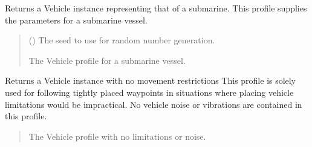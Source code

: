 \documentclass[letterpaper,10pt,english]{sphinxmanual}
\begin{document}
\begin{fulllineitems}
\label{\detokenize{modules/waypoints/vehicle:qnav.waypoints.vehicle.get_submarine_profile}}
\pysigstartsignatures
{}
\pysigstopsignatures
\sphinxAtStartPar
Returns a Vehicle instance representing that of a submarine.
This profile supplies the parameters for a submarine vessel.
\begin{quote}\begin{description}
\sphinxAtStartPar
{} () \textendash{} The seed to use for random number generation.

\sphinxAtStartPar
The Vehicle profile for a submarine vessel.

\sphinxAtStartPar
{\hyperref[\detokenize{modules/waypoints/vehicle:qnav.waypoints.vehicle.Vehicle}]{}}

\end{description}\end{quote}

\end{fulllineitems}


\begin{fulllineitems}
\label{\detokenize{modules/waypoints/vehicle:qnav.waypoints.vehicle.get_unrestricted_profile}}
\pysigstartsignatures
{}
\pysigstopsignatures
\sphinxAtStartPar
Returns a Vehicle instance with no movement restrictions
This profile is solely used for following tightly placed waypoints in
situations where placing vehicle limitations would be impractical. No
vehicle noise or vibrations are contained in this profile.
\begin{quote}\begin{description}
\sphinxAtStartPar
The Vehicle profile with no limitations or noise.

\sphinxAtStartPar
{\hyperref[\detokenize{modules/waypoints/vehicle:qnav.waypoints.vehicle.Vehicle}]{}}

\end{description}\end{quote}

\end{fulllineitems}
\end{document}
